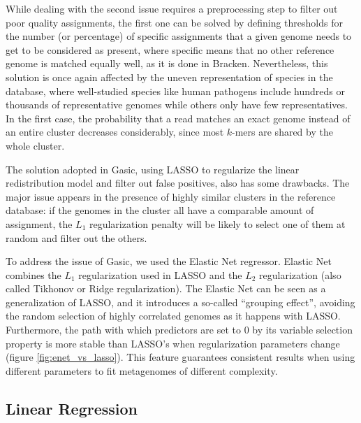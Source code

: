 While dealing with the second issue requires a preprocessing step to filter out poor quality assignments, the first one can be solved by defining thresholds for the number (or percentage) of specific assignments that a given genome needs to get to be considered as present, where specific means that no other reference genome is matched equally well, as it is done in Bracken. Nevertheless, this solution is once again affected by the uneven representation of species in the database, where well-studied species like human pathogens include hundreds or thousands of representative genomes while others only have few representatives. In the first case, the probability that a read matches an exact genome instead of an entire cluster decreases considerably, since most $k$-mers are shared by the whole cluster.

The solution adopted in Gasic, using LASSO \cite{tibshirani_regression_1996} to regularize the linear redistribution model and filter out false positives, also has some drawbacks. The major issue appears in the presence of highly similar clusters in the reference database: if the genomes in the cluster all have a comparable amount of assignment, the $L_1$ regularization penalty will be likely to select one of them at random and filter out the others.

To address the issue of Gasic, we used the Elastic Net regressor. Elastic Net combines the $L_1$ regularization used in LASSO and the $L_2$ regularization (also called Tikhonov or Ridge regularization). The Elastic Net can be seen as a generalization of LASSO, and it introduces a so-called ``grouping effect'', avoiding the random selection of highly correlated genomes as it happens with LASSO. Furthermore, the path with which predictors are set to 0 by its variable selection property is more stable than LASSO's when regularization parameters change (figure \ref{fig:enet_vs_lasso}). This feature guarantees consistent results when using different parameters to fit metagenomes of different complexity.

\subsection{Linear Regression}

